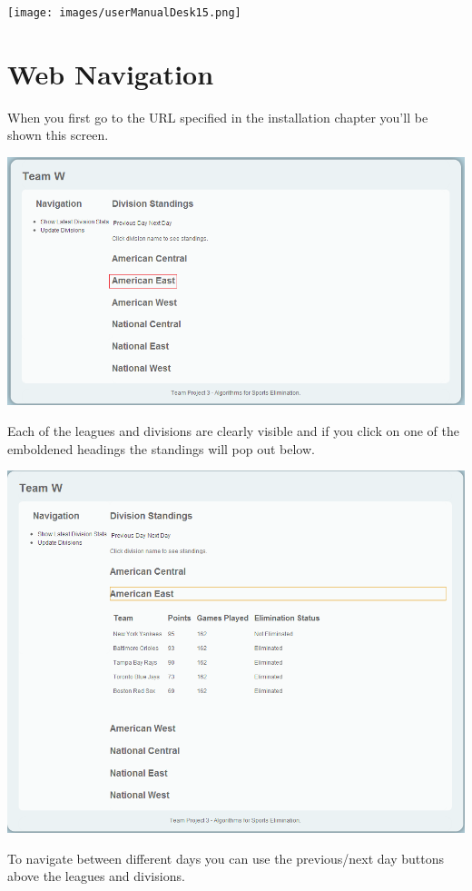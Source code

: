\texttt{[image: images/userManualDesk15.png]}

\section{Web Navigation}

When you first go to the URL specified in the installation chapter you'll be shown this screen.

\includegraphics[width=\linewidth,keepaspectratio]{images/userManualWeb1.png}

Each of the leagues and divisions are clearly visible and if you click on one of the emboldened headings the standings will pop out below.

\includegraphics[width=\linewidth,keepaspectratio]{images/userManualWeb2.png}

To navigate between different days you can use the previous/next day buttons above the leagues and divisions.

